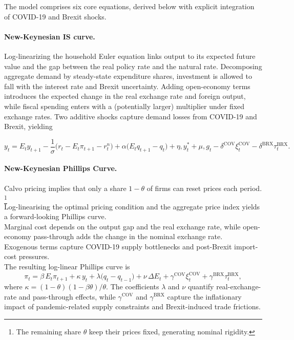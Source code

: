 \documentclass[
]{article}
\begin{document}
	The model comprises six core equations, derived below with explicit integration of COVID-19 and Brexit shocks.
	
	\paragraph*{New-Keynesian IS curve.} 
	
	Log-linearizing the household Euler equation links output to its expected future value and the gap between the real policy rate and the natural rate. Decomposing aggregate demand by steady-state expenditure shares, investment is allowed to fall with the interest rate and Brexit uncertainty. Adding open-economy terms introduces the expected change in the real exchange rate and foreign output, while fiscal spending enters with a (potentially larger) multiplier under fixed exchange rates. Two additive shocks capture demand losses from COVID-19 and Brexit, yielding
	
	\begin{equation}
		y_t = E_t y_{t+1}
		- \frac{1}{\sigma}\bigl(r_t - E_t\pi_{t+1} - r_t^{n}\bigr)
		+ \alpha\bigl(E_t q_{t+1} - q_t\bigr)
		+ \eta,y_t^{*}
		+ \mu,g_t
		- \delta^{\mathrm{COV}}\xi_t^{\mathrm{COV}}
		- \delta^{\mathrm{BRX}}\tau_t^{\mathrm{BRX}}.
	\end{equation}
	
	\paragraph*{New-Keynesian Phillips Curve.}
	
	Calvo pricing implies that only a share \(1-\theta\) of firms can reset prices each period.
	\footnote{The remaining share \(\theta\) keep their prices fixed, generating nominal rigidity.} \\
	Log-linearising the optimal pricing condition and the aggregate price index yields a forward-looking Phillips curve. \\
	Marginal cost depends on the output gap and the real exchange rate, while open-economy pass-through adds the change in the nominal exchange rate. \\
	Exogenous terms capture COVID-19 supply bottlenecks and post-Brexit import-cost pressures. \\
	The resulting log-linear Phillips curve is
	\begin{equation}
		\pi_t
		= \beta\,E_t\pi_{t+1}
		+ \kappa\,y_t
		+ \lambda\bigl(q_t - q_{t-1}\bigr)
		+ \nu\,\Delta E_t
		+ \gamma^{\mathrm{COV}}\xi_t^{\mathrm{COV}}
		+ \gamma^{\mathrm{BRX}}\tau_t^{\mathrm{BRX}},
		\label{eq:phillips_condensed}
	\end{equation}
	where \(\kappa=(1-\theta)(1-\beta\theta)/\theta\).
	The coefficients \(\lambda\) and \(\nu\) quantify real-exchange-rate and pass-through effects, while \(\gamma^{\mathrm{COV}}\) and \(\gamma^{\mathrm{BRX}}\) capture the inflationary impact of pandemic-related supply constraints and Brexit-induced trade frictions.
	
\end{document}
